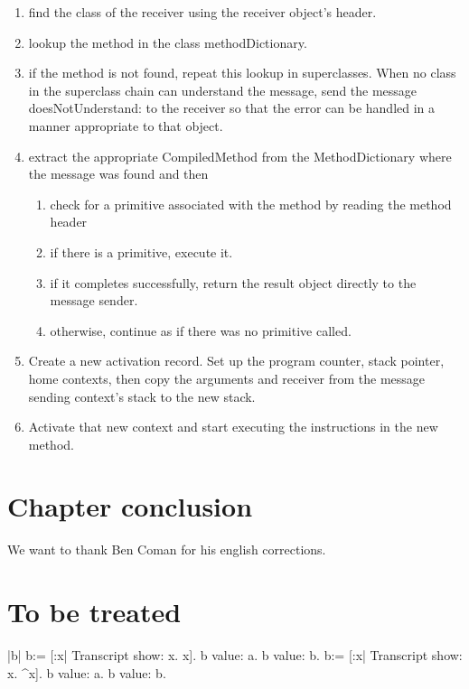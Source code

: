 \documentclass[a4paper,10pt,twoside]{book}
\begin{document}
\begin{enumerate}
\item find the class of the receiver using the receiver object's header.
\item lookup the method in the class methodDictionary.
\item if the method is not found, repeat this lookup in superclasses.
When no class in the superclass chain can understand the message, send the message doesNotUnderstand: to the receiver so that the error can be handled in a manner appropriate to that object.

\item extract the appropriate CompiledMethod from the MethodDictionary where the message was found and then 
\begin{enumerate}
\item check for a primitive associated with the method by reading the method header
\item if there is a primitive, execute it.
\item if it completes successfully, return the result object directly to the message sender.
\item otherwise, continue as if there was no primitive called.
\end{enumerate}
\item Create a new activation record. Set up the program counter, stack pointer,
home contexts, then copy the arguments and receiver from the message sending context's stack to the new stack.

\item Activate that new context and start executing the instructions in the new method.
\end{enumerate}








\section{Chapter conclusion}


We want to thank Ben Coman for his english corrections.

\section{To be treated}

\begin{code}{}
|b| 
b:= [:x| Transcript show: x. x].
b value: a. b value: b.
b:= [:x| Transcript show: x. ^x].
b value: a. b value: b.
\end{code}
 
\end{document}
